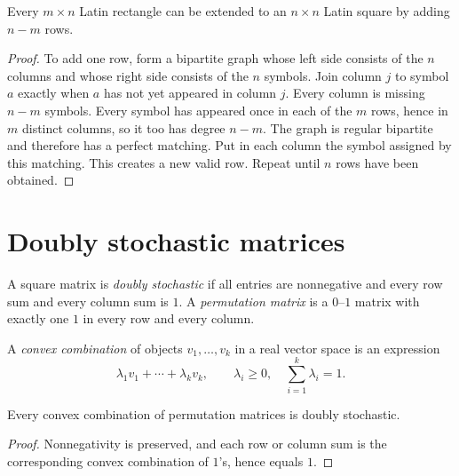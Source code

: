 \begin{notetheorem}
Every $m\times n$ Latin rectangle can be extended to an $n\times n$ Latin
square by adding $n-m$ rows.
\end{notetheorem}
\begin{proof}
To add one row, form a bipartite graph whose left side consists of the $n$
columns and whose right side consists of the $n$ symbols.  Join column $j$ to
symbol $a$ exactly when $a$ has not yet appeared in column $j$.  Every column
is missing $n-m$ symbols.  Every symbol has appeared once in each of the $m$
rows, hence in $m$ distinct columns, so it too has degree $n-m$.  The graph is
regular bipartite and therefore has a perfect matching.  Put in each column
the symbol assigned by this matching.  This creates a new valid row.  Repeat
until $n$ rows have been obtained.
\end{proof}
\section{Doubly stochastic matrices}

\begin{notedefinition}
A square matrix is \emph{doubly stochastic} if all entries are nonnegative and
every row sum and every column sum is $1$.  A \emph{permutation matrix} is a
$0$--$1$ matrix with exactly one $1$ in every row and every column.
\end{notedefinition}

\begin{notedefinition}
A \emph{convex combination} of objects $v_1,\dots,v_k$ in a real vector space
is an expression
\[
  \lambda_1v_1+\cdots+\lambda_kv_k,
  \qquad
  \lambda_i\ge0,
  \quad
  \sum_{i=1}^k\lambda_i=1.
\]
\end{notedefinition}

\begin{notetheorem}
Every convex combination of permutation matrices is doubly stochastic.
\end{notetheorem}
\begin{proof}
Nonnegativity is preserved, and each row or column sum is the corresponding
convex combination of $1$'s, hence equals $1$.
\end{proof}

